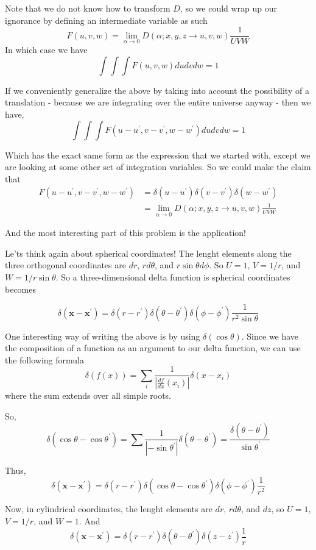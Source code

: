 Note that we do not know how to transform $D$, so we could wrap up our ignorance by defining an intermediate variable as such
$$
F(u,v,w) = \lim_{\alpha\rightarrow 0} D(\alpha; x, y, z \rightarrow u, v, w) \frac{1}{UVW}
$$
In which case we have
$$
\int \int \int F(u,v,w) du dv dw = 1
$$

If we conveniently generalize the above by taking into account the possibility of a translation - because we are integrating over
the entire universe anyway - then we have,
$$
\int \int \int F(u-u^\prime, v-v^\prime, w-w^\prime) du dv dw = 1
$$

Which has the exact same form as the expression that we started with, except we are looking at some other set of integration variables.
So we could make the claim that
\begin{align*}
F(u-u^\prime, v-v^\prime, w-w^\prime) &= \delta(u-u^\prime) \delta(v-v^\prime) \delta(w-w^\prime) \\
&= \lim_{\alpha\rightarrow 0} D(\alpha; x, y, z \rightarrow u, v, w) \frac{1}{UVW}
\end{align*}


And the most interesting part of this problem is the application!

Le'ts think again about spherical coordinates!
The lenght elements along the three orthogonal coordinates are $dr$, $rd\theta$, and $r\sin\theta d\phi$.
So $U=1$, $V=1/r$, and $W=1/r\sin\theta$.
So a three-dimensional delta function is spherical coordinates becomes

$$
\delta\left(\mathbf{x}-\mathbf{x}^\prime\right) =
\delta(r-r^\prime) \delta(\theta-\theta^\prime) \delta(\phi-\phi^\prime) \frac{1}{r^2 \sin\theta}
$$

One interesting way of writing the above is by using $\delta(\cos\theta)$.
Since we have the composition of a function as an argument to our delta function, we can use the following formula
$$
\delta\left(f(x)\right) = \sum_i \frac{1}{\left|\frac{df}{dx} (x_i)\right|} \delta(x-x_i)
$$
where the sum extends over all simple roots.

So,
$$
\delta(\cos\theta - \cos\theta^\prime)
= \sum \frac{1}{\left|-\sin\theta^\prime \right|} \delta(\theta-\theta^\prime)
= \frac{\delta(\theta-\theta^\prime)}{\sin\theta^\prime}
$$

Thus,
$$
\delta\left(\mathbf{x}-\mathbf{x}^\prime\right) =
\delta(r-r^\prime) \delta(\cos\theta-\cos\theta^\prime) \delta(\phi-\phi^\prime) \frac{1}{r^2}
$$

Now, in cylindrical coordinates, the lenght elements are $dr$, $rd\theta$, and $dz$, so
$U=1$, $V=1/r$, and $W=1$.
And
$$
\delta\left(\mathbf{x}-\mathbf{x}^\prime\right) =
\delta(r-r^\prime) \delta(\theta-\theta^\prime) \delta(z-z^\prime) \frac{1}{r}
$$


